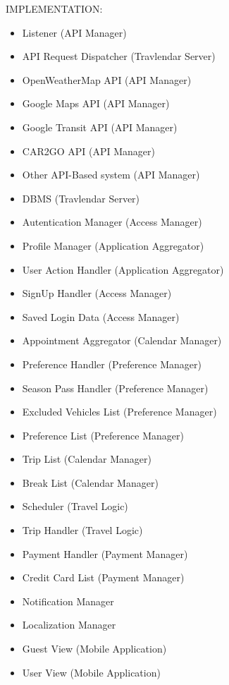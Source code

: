 



IMPLEMENTATION:

\begin{itemize}
	\item	 Listener								(API Manager)
	\item API Request Dispatcher		(Travlendar Server)
	\item	 OpenWeatherMap API 			(API Manager)
	\item Google Maps API					(API Manager)
	\item Google Transit API				(API Manager)
	\item CAR2GO API							(API Manager)
	\item Other API-Based system		(API Manager)
	\item DBMS									(Travlendar Server)
	\item Autentication Manager          (Access Manager)
	\item Profile Manager					(Application Aggregator)
	\item User Action Handler				(Application Aggregator)
	\item SignUp Handler 					(Access Manager)
	\item Saved Login Data   				(Access Manager)
	\item Appointment Aggregator		(Calendar Manager)
	\item Preference Handler				(Preference Manager)
	\item Season Pass Handler			(Preference Manager)
	\item Excluded Vehicles List			(Preference Manager)
	\item Preference List						(Preference Manager)
	\item Trip List								(Calendar Manager)
	\item Break List								(Calendar Manager)
	\item Scheduler 							(Travel Logic)
	\item Trip Handler							(Travel Logic)
	\item Payment Handler					(Payment Manager)
	\item Credit Card List					(Payment Manager)
	\item Notification Manager
	\item Localization Manager
	\item Guest View 							(Mobile Application)
	\item User View								(Mobile Application)


\end{itemize}


